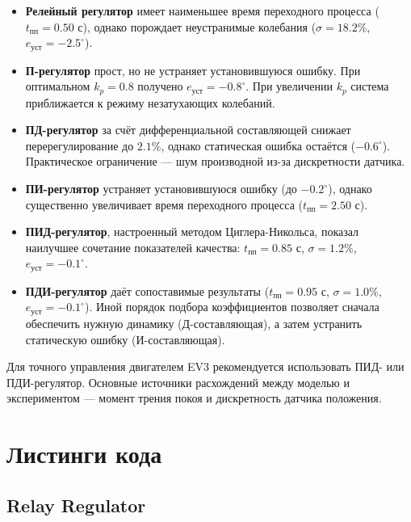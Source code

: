 \documentclass[a4paper, 12pt]{article}
\begin{document}
\begin{itemize}
    \item \textbf{Релейный регулятор} имеет наименьшее время переходного процесса
    ($t_{\text{пп}} = 0.50$ с), однако порождает неустранимые колебания
    ($\sigma = 18.2\%$, $e_{\text{уст}} = -2.5^\circ$).

    \item \textbf{П-регулятор} прост, но не устраняет установившуюся ошибку.
    При оптимальном $k_p = 0.8$ получено $e_{\text{уст}} = -0.8^\circ$.
    При увеличении $k_p$ система приближается к режиму незатухающих колебаний.

    \item \textbf{ПД-регулятор} за счёт дифференциальной составляющей снижает
    перерегулирование до $2.1\%$, однако статическая ошибка остаётся ($-0.6^\circ$).
    Практическое ограничение --- шум производной из-за дискретности датчика.

    \item \textbf{ПИ-регулятор} устраняет установившуюся ошибку (до $-0.2^\circ$),
    однако существенно увеличивает время переходного процесса ($t_{\text{пп}} = 2.50$ с).

    \item \textbf{ПИД-регулятор}, настроенный методом Циглера-Никольса, показал
    наилучшее сочетание показателей качества: $t_{\text{пп}} = 0.85$ с,
    $\sigma = 1.2\%$, $e_{\text{уст}} = -0.1^\circ$.

    \item \textbf{ПДИ-регулятор} даёт сопоставимые результаты ($t_{\text{пп}} = 0.95$ с,
    $\sigma = 1.0\%$, $e_{\text{уст}} = -0.1^\circ$). Иной порядок подбора
    коэффициентов позволяет сначала обеспечить нужную динамику (Д-составляющая),
    а затем устранить статическую ошибку (И-составляющая).
\end{itemize}

Для точного управления двигателем EV3 рекомендуется использовать ПИД- или
ПДИ-регулятор. Основные источники расхождений между моделью и экспериментом ---
момент трения покоя и дискретность датчика положения.
\newpage


\newpage
\section{Листинги кода}

\subsection{Relay Regulator}
\end{document}

